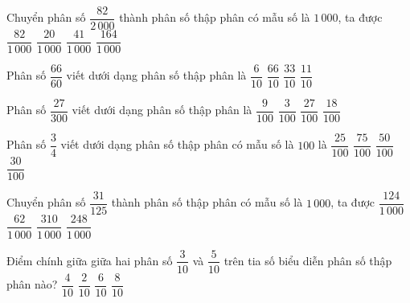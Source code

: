 \begin{ex} %
Chuyển phân số $\dfrac{82}{2\,000}$ thành phân số thập phân có mẫu số là $1\,000$, ta được
\choice
{$\dfrac{82}{1\,000}$}
{$\dfrac{20}{1\,000}$}
{\True $\dfrac{41}{1\,000}$}
{$\dfrac{164}{1\,000}$}
\end{ex}

\begin{ex} %
Phân số $\dfrac{66}{60}$ viết dưới dạng phân số thập phân là
\choice
{$\dfrac{6}{10}$}
{$\dfrac{66}{10}$}
{$\dfrac{33}{10}$}
{\True $\dfrac{11}{10}$}
\end{ex}

\begin{ex} %
Phân số $\dfrac{27}{300}$ viết dưới dạng phân số thập phân là
\choice
{\True $\dfrac{9}{100}$}
{$\dfrac{3}{100}$}
{$\dfrac{27}{100}$}
{$\dfrac{18}{100}$}
\end{ex}

\begin{ex} %
Phân số $\dfrac{3}{4}$ viết dưới dạng phân số thập phân có mẫu số là $100$ là
\choice
{$\dfrac{25}{100}$}
{\True $\dfrac{75}{100}$}
{$\dfrac{50}{100}$}
{$\dfrac{30}{100}$}
\end{ex}

\begin{ex} %
Chuyển phân số $\dfrac{31}{125}$ thành phân số thập phân có mẫu số là $1\,000$, ta được
\choice
{$\dfrac{124}{1\,000}$}
{$\dfrac{62}{1\,000}$}
{$\dfrac{310}{1\,000}$}
{\True $\dfrac{248}{1\,000}$}
\end{ex}

\begin{ex} %
Điểm chính giữa giữa hai phân số $\dfrac{3}{10}$ và $\dfrac{5}{10}$ trên tia số biểu diễn phân số thập phân nào?
\choice
{\True $\dfrac{4}{10}$}
{$\dfrac{2}{10}$}
{$\dfrac{6}{10}$}
{$\dfrac{8}{10}$}
\end{ex}


